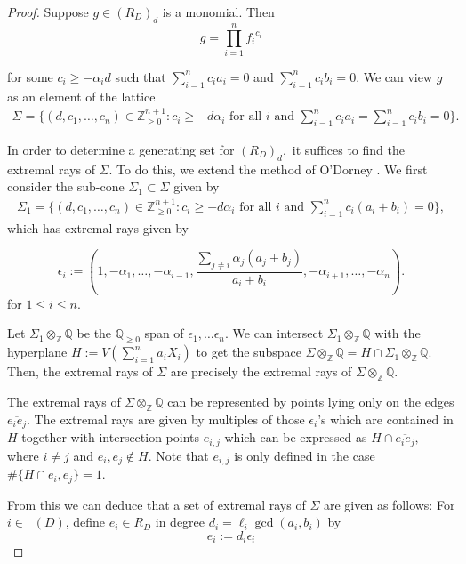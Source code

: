 \documentclass{amsart}
\theoremstyle{plain}
\theoremstyle{definition}
\theoremstyle{remark}
\numberwithin{equation}{section}
\newcommand\bq{{\mathbb Q}}
\newcommand\bz{{\mathbb Z}}
\newcommand\bida{a}
\newcommand\bidb{b}
\DeclareMathOperator{\Te}{T_=}
\begin{document}
\begin{proof}
Suppose $g
\in (R_D)_d$ is a monomial.
 Then 
\[
	g = \prod_{i = 1}^n {f_i}^{c_i}
\]

\noindent
for some $c_i \ge - \alpha_i d$ such that $\sum_{i=1}^n c_i \bida_i = 0$
and $\sum_{i=1}^n c_i \bidb_i = 0$. We can view $g$ as an element of the
lattice 
\begin{align*}
	\Sigma = \{ (d, c_1, \ldots, c_n) \in \bz_{\geq 0}^{n+1} : c_i \ge - d
\alpha_i \text{ for all }i \text{ and }\sum_{i=1}^n c_i \bida_i = \sum_{i =
1}^n c_i \bidb_i = 0 \}.	
\end{align*}

In order to determine a generating
set for $(R_D)_d,$ it suffices to find the extremal rays of $\Sigma.$
To do this, we extend the method of O'Dorney \cite[Theorem 8]{dorney:canonical}. 
We first consider the sub-cone $\Sigma_1 \subset \Sigma$
given by
\begin{align*}
	\Sigma_1 = \{ (d, c_1, \ldots, c_n) \in \bz_{\geq 0}^{n+1} : c_i \ge -
d \alpha_i \text{ for all }i \text{ and }\sum_{i=1}^n c_i (\bida_i+\bidb_i) = 0
\},
\end{align*}
which
has extremal rays given by
 
\[
	\epsilon_i := (1, -\alpha_1, \ldots, -\alpha_{i-1}, \frac{\sum_{j \ne i}
	\alpha_j (\bida_j + \bidb_j)}{\bida_i + \bidb_i}, -\alpha_{i + 1},
	\ldots, -\alpha_n).
\]
for $1 \leq i \leq n$.

Let $\Sigma_1 \otimes_\bz \bq$ be the $\bq_{\ge 0}$ span of $\epsilon_1, \ldots \epsilon_n$.
We can intersect $\Sigma_1 \otimes_\bz \bq$ with the hyperplane $H :=
V(\sum_{i=1}^n \bida_i X_i)$  to get the subspace $\Sigma \otimes_\bz \bq = H \cap \Sigma_1
\otimes_\bz \bq$.  Then, the extremal rays of $\Sigma$ are precisely the extremal 
rays of $\Sigma \otimes_\bz \bq$.

The extremal rays of $\Sigma \otimes_\bz \bq$ can be represented by points
lying only on the edges 
$\overline{e_i e_j}$.
The extremal rays are given by multiples of those $\epsilon_i$'s
which are contained in $H$ together with intersection points $e_{i, j}$ which
can be expressed as $H \cap \overline{e_i e_j},$ where $i \neq j$ and $e_i,
e_j \notin H$. Note that $e_{i,j}$ is only defined in the case
$\# \{H \cap \overline{e_i, e_j}\} = 1$.


From this we can deduce that a set of extremal rays of $\Sigma$ are given as follows:
For $i \in \Te(D)$, define $e_i \in R_D$ in degree $d_i = \ell_i \gcd(a_i, b_i)$ by 
\begin{equation}\label{eqn:epsilon_i}
	e_i := d_i \epsilon_i %
\end{equation}


\end{proof}
\end{document}

